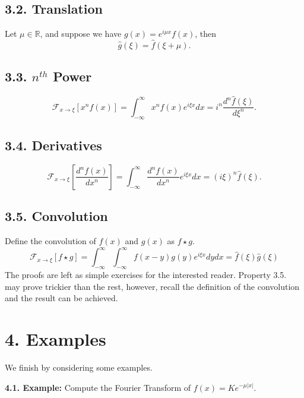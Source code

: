 \documentclass[11pt]{article}
\begin{document}
\subsection*{3.2. Translation}
Let $\mu \in \mathbb{R}$, and suppose we have $g(x) = e^{i \mu x} f(x)$, then
\begin{equation}
    \hat{g}(\xi) = \hat{f}(\xi + \mu).
\end{equation}

\subsection*{3.3. $n^{th}$ Power}
\begin{equation}
    \mathcal{F}_{x \rightarrow \xi}[x^n f(x)] = \int_{-\infty}^{\infty} x^n f(x) e^{i \xi x} dx = i^n \frac{d^n \hat{f}(\xi)}{d\xi^n}.
\end{equation}

\subsection*{3.4. Derivatives}
\begin{equation}
    \mathcal{F}_{x \rightarrow \xi}\left[\frac{d^n f(x)}{dx^n}\right] = \int_{-\infty}^{\infty} \frac{d^n f(x)}{dx^n} e^{i \xi x} dx = (i \xi)^n \hat{f}(\xi).
\end{equation}

\subsection*{3.5. Convolution}
Define the convolution of $f(x)$ and $g(x)$ as $f \star g$.
\begin{equation}
    \mathcal{F}_{x \rightarrow \xi}[f \star g] = \int_{-\infty}^{\infty} \int_{-\infty}^{\infty} f(x - y) g(y) e^{i \xi x} dy dx = \hat{f}(\xi) \hat{g}(\xi)  
\end{equation}
The proofs are left as simple exercises for the interested reader. Property 3.5. may prove trickier than the rest, however, recall the definition of the convolution and the result can be achieved. 

\newpage

\section*{4. Examples}
We finish by considering some examples.

\textbf{4.1. Example:} Compute the Fourier Transform of $f(x) = K e^{-\mu |x|}$.
\end{document}

